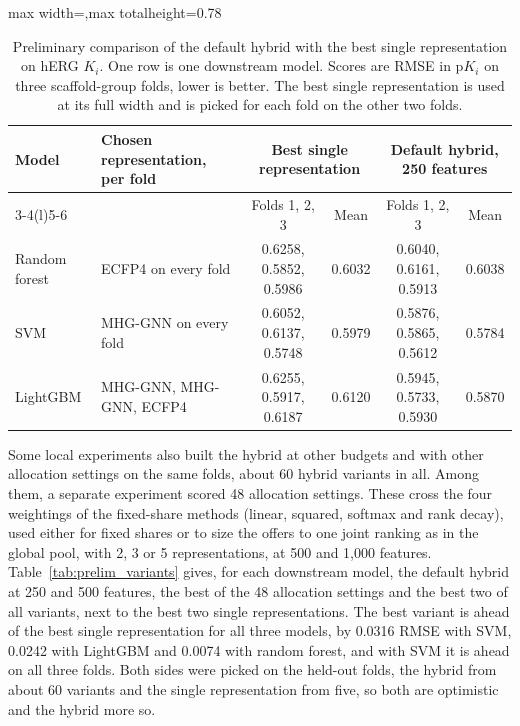 \begin{table}[htbp]
\centering
\small
\begin{adjustbox}{max width=\textwidth,max totalheight=0.78\textheight}
\begin{tabular}{@{}llcccc@{}}
\toprule
Model & Chosen representation, per fold & \multicolumn{2}{c}{Best single representation} & \multicolumn{2}{c}{Default hybrid, 250 features} \\
\cmidrule(lr){3-4}\cmidrule(l){5-6}
 & & Folds 1, 2, 3 & Mean & Folds 1, 2, 3 & Mean \\
\midrule
Random forest & ECFP4 on every fold & 0.6258, 0.5852, 0.5986 & 0.6032 & 0.6040, 0.6161, 0.5913 & 0.6038 \\
SVM & MHG-GNN on every fold & 0.6052, 0.6137, 0.5748 & 0.5979 & 0.5876, 0.5865, 0.5612 & 0.5784 \\
LightGBM & MHG-GNN, MHG-GNN, ECFP4 & 0.6255, 0.5917, 0.6187 & 0.6120 & 0.5945, 0.5733, 0.5930 & 0.5870 \\
\bottomrule
\end{tabular}
\end{adjustbox}
\caption[Preliminary: the default hybrid against the best single representation on hERG $K_i$.]{Preliminary comparison of the default hybrid with the best single representation on hERG $K_i$. One row is one downstream model. Scores are RMSE in p$K_i$ on three scaffold-group folds, lower is better. The best single representation is used at its full width and is picked for each fold on the other two folds.}
\label{tab:prelim_default_vs_single}
\end{table}

Some local experiments also built the hybrid at other budgets and with other allocation settings on the same folds, about 60 hybrid variants in all. Among them, a separate experiment scored 48 allocation settings. These cross the four weightings of the fixed-share methods (linear, squared, softmax and rank decay), used either for fixed shares or to size the offers to one joint ranking as in the global pool, with 2, 3 or 5 representations, at 500 and 1,000 features. Table~\ref{tab:prelim_variants} gives, for each downstream model, the default hybrid at 250 and 500 features, the best of the 48 allocation settings and the best two of all variants, next to the best two single representations. The best variant is ahead of the best single representation for all three models, by 0.0316 RMSE with SVM, 0.0242 with LightGBM and 0.0074 with random forest, and with SVM it is ahead on all three folds. Both sides were picked on the held-out folds, the hybrid from about 60 variants and the single representation from five, so both are optimistic and the hybrid more so.

